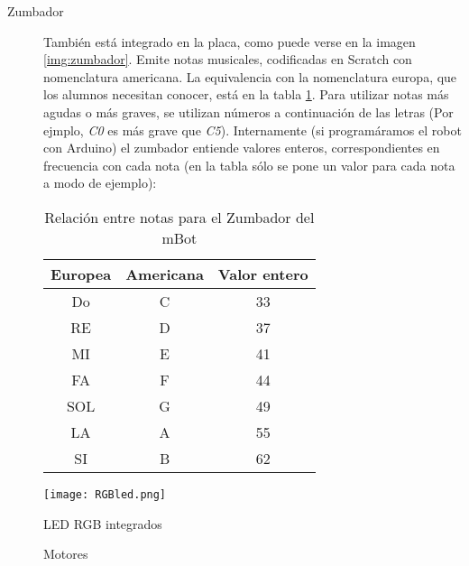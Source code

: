 \begin{description}
	\item [Zumbador] También está integrado en la placa, como puede verse en la imagen \ref{img:zumbador}. Emite notas musicales, codificadas en Scratch con nomenclatura americana. La equivalencia con la nomenclatura europa, que los alumnos necesitan conocer, está en la tabla \ref{table:notasZumbador}. Para utilizar notas más agudas o más graves, se utilizan números a continuación de las letras (Por ejmplo, \textit{C0} es más grave que \textit{C5}). Internamente (si programáramos el robot con Arduino) el zumbador entiende valores enteros, correspondientes en frecuencia con cada nota (en la tabla sólo se pone un valor para cada nota a modo de ejemplo):
	\begin{table}[h]
		\centering
		\begin{tabular}{ c | c | c}	
			Europea & Americana & Valor entero \\
			\hline			
			Do & C & 33\\
			RE & D & 37\\
			MI & E & 41\\
			FA & F & 44\\
			SOL & G & 49\\
			LA & A & 55\\
			SI & B & 62\\
		\end{tabular}
	
	\caption{Relación entre notas para el Zumbador del mBot}
	\label{table:notasZumbador}
	\end{table}	
\end{description}

\begin{figure}[H]
	\texttt{[image: RGBled.png]}
	\centering
	\caption{LED RGB integrados}
	\label{img:LED}
\end{figure}

\begin{figure}[H]
	\begin{center}
		\begin{subfigure}
			[Puerto de conexión de los motores]{
				\texttt{[image: puertomotor.png]}
				\label{img:puertomotor}}
		\end{subfigure}
		\begin{subfigure}
			[Motor DC]{			
				\texttt{[image: motorDC2.png]}
				\label{img:motor1}}
		\end{subfigure}
		\begin{subfigure}
			[Motor DC: montaje con rueda]{			
				\texttt{[image: motorDC.png]}
				\label{img:motor2}}
		\end{subfigure}				
		\caption{Motores}
		\label{img:motores}
	\end{center}
\end{figure}


